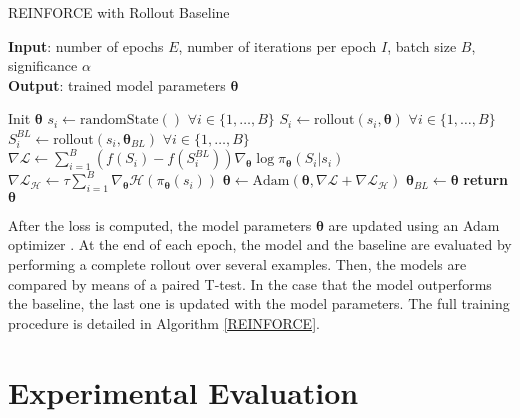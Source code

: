 \documentclass{article}
\theoremstyle{definition}
\begin{document}
\begin{algorithm}[ht]
    \caption{REINFORCE with Rollout Baseline}
    \label{REINFORCE}
    \textbf{Input}: number of epochs $E$, number of iterations per epoch $I$, batch size $B$, significance $\alpha$\\
    \textbf{Output}: trained model parameters $\boldsymbol{\theta}$ \\ \vspace{-12pt}
    \begin{algorithmic}[1]
        \STATE Init $\boldsymbol{\theta}$
                \STATE $s_i \gets \text{randomState}()$ \hspace{8pt} $\forall i \in \{ 1, \dots, B\}$
                \STATE $S_i \gets \text{rollout}(s_i, \boldsymbol{\theta})$ \hspace{8pt} $\forall i \in \{ 1, \dots, B\}$
                \STATE $S_i^{BL} \gets \text{rollout}(s_i, \boldsymbol{\theta}_{BL})$ \hspace{8pt} $\forall i \in \{ 1, \dots, B\}$
                \STATE $\nabla \mathcal{L} \gets \sum_{i=1}^B \left( f(S_i) - f(S_i^{BL}) \right) \nabla_{\boldsymbol{\theta}} \log \pi_{\boldsymbol{\theta}}(S_i | s_i)$
                \STATE $\nabla \mathcal{L}_{\mathcal{H}} \gets \tau \sum_{i=1}^B \nabla_{\boldsymbol{\theta}} \mathcal{H}(\pi_{\boldsymbol{\theta}}(s_i)) $
                \STATE $\boldsymbol{\theta} \gets \text{Adam}(\boldsymbol{\theta}, \nabla \mathcal{L} + \nabla \mathcal{L}_{\mathcal{H}})$
            \ENDFOR
                \STATE $\boldsymbol{\theta}_{BL} \gets \boldsymbol{\theta}$
            \ENDIF
        \ENDFOR
        \STATE \textbf{return} $\boldsymbol{\theta}$
    \end{algorithmic}
\end{algorithm}

After the loss is computed, the model parameters $\boldsymbol{\theta}$ are updated using an Adam optimizer \cite{kingma2014adam}. At the end of each epoch, the model and the baseline are evaluated by performing a complete rollout over several examples. Then, the models are compared by means of a paired T-test. In the case that the model outperforms the baseline, the last one is updated with the model parameters. The full training procedure is detailed in Algorithm \ref{REINFORCE}.

\section{Experimental Evaluation}
\label{sec:exp}
\end{document}
